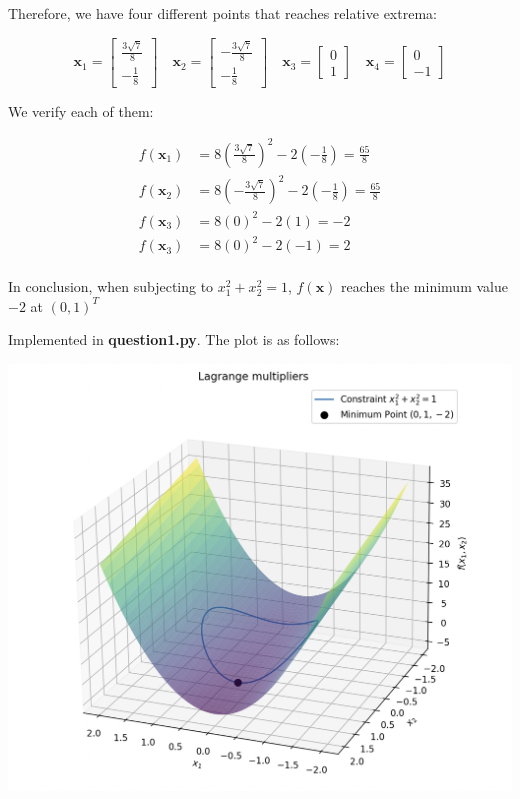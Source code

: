 \begin{solution}
    Therefore, we have four different points that reaches relative extrema:

    \[
        \mathbf{x}_1 =
        \begin{bmatrix}
            \frac{3\sqrt{7}}{8} \\ -\frac{1}{8}
        \end{bmatrix}
        \quad
        \mathbf{x}_2 =
        \begin{bmatrix}
            -\frac{3\sqrt{7}}{8} \\ -\frac{1}{8}
        \end{bmatrix}
        \quad
        \mathbf{x}_3 =
        \begin{bmatrix}
            0 \\ 1
        \end{bmatrix}
        \quad
        \mathbf{x}_4 =
        \begin{bmatrix}
            0 \\ -1
        \end{bmatrix}
    \]

    We verify each of them:

    \[
        \begin{align*}
            f(\mathbf{x}_1) &= 8\left(\frac{3\sqrt{7}}{8}\right)^2 -2\left(-\frac{1}{8}\right) = \frac{65}{8} \\
            f(\mathbf{x}_2) &= 8\left(-\frac{3\sqrt{7}}{8}\right)^2 -2\left(-\frac{1}{8}\right) = \frac{65}{8} \\
            f(\mathbf{x}_3) &= 8(0)^2 - 2(1) = -2 \\
            f(\mathbf{x}_3) &= 8(0)^2 - 2(-1) = 2 \\
        \end{align*}
    \]

    In conclusion, when subjecting to $x_1^2 + x_2^2 = 1$, $f(\mathbf{x})$ reaches the minimum value $-2$ at $(0, 1)^T$

     Implemented in \textbf{question1.py}.
    The plot is as follows:

    \centerline {
        \includegraphics[width=1\textwidth]{img/q1}
    }

\end{solution}